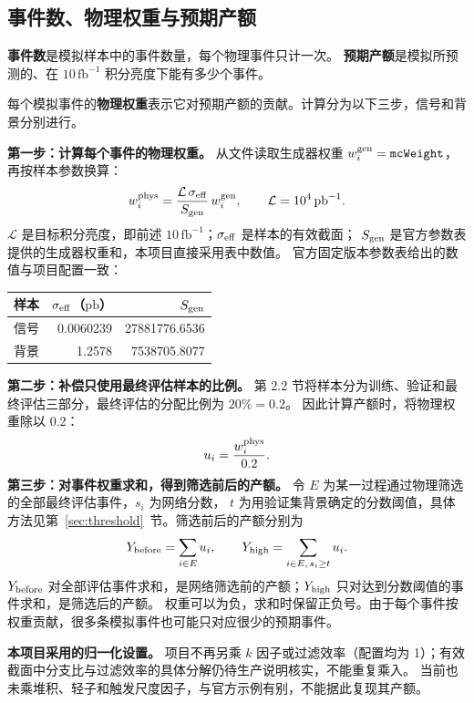 \documentclass[11pt,a4paper,fontset=fandol,scheme=plain]{ctexart}
\begin{document}
\subsection{事件数、物理权重与预期产额}

\label{sec:weights}
\textbf{事件数}是模拟样本中的事件数量，每个物理事件只计一次。
\textbf{预期产额}是模拟所预测的、在 $10\,\mathrm{fb}^{-1}$ 积分亮度下能有多少个事件。

每个模拟事件的\textbf{物理权重}表示它对预期产额的贡献。计算分为以下三步，信号和背景分别进行。

\textbf{第一步：计算每个事件的物理权重。}
从文件读取生成器权重 $w_i^{\rm gen}=\texttt{mcWeight}$，再按样本参数换算：
\[
 w_i^{\rm phys}=\frac{\mathcal L\,\sigma_{\rm eff}}{S_{\rm gen}}\,w_i^{\rm gen},
 \qquad \mathcal L=10^4\,\mathrm{pb}^{-1}.
\]
$\mathcal L$ 是目标积分亮度，即前述 $10\,\mathrm{fb}^{-1}$；$\sigma_{\rm eff}$ 是样本的有效截面；
$S_{\rm gen}$ 是官方参数表提供的生成器权重和，本项目直接采用表中数值。
官方固定版本参数表\cite{SampleInfo}给出的数值与项目配置一致：
\begin{center}
\small
\begin{tabular}{lrr}
\toprule
样本 & $\sigma_{\rm eff}$（$\mathrm{pb}$） & $S_{\rm gen}$ \\
\midrule
信号 & 0.0060239 & 27881776.6536 \\
背景 & 1.2578 & 7538705.8077 \\
\bottomrule
\end{tabular}
\end{center}

\textbf{第二步：补偿只使用最终评估样本的比例。}
第 2.2 节将样本分为训练、验证和最终评估三部分，最终评估的分配比例为 $20\%=0.2$。
因此计算产额时，将物理权重除以 0.2：
\[
 u_i=\frac{w_i^{\rm phys}}{0.2}.
\]
\textbf{第三步：对事件权重求和，得到筛选前后的产额。}
令 $E$ 为某一过程通过物理筛选的全部最终评估事件，$s_i$ 为网络分数，
$t$ 为用验证集背景确定的分数阈值，具体方法见第~\ref{sec:threshold}~节。筛选前后的产额分别为
\[
 Y_{\rm before}=\sum_{i\in E}u_i,\qquad
 Y_{\rm high}=\sum_{i\in E,\,s_i\geq t}u_i.
\]
$Y_{\rm before}$ 对全部评估事件求和，是网络筛选前的产额；$Y_{\rm high}$ 只对达到分数阈值的事件求和，是筛选后的产额。
权重可以为负，求和时保留正负号。由于每个事件按权重贡献，很多条模拟事件也可能只对应很少的预期事件。

\textbf{本项目采用的归一化设置。}
项目不再另乘 $k$ 因子或过滤效率（配置均为 1）；有效截面中分支比与过滤效率的具体分解仍待生产说明核实，不能重复乘入。
当前也未乘堆积、轻子和触发尺度因子，与官方示例\cite{HZZAnalysis}有别，不能据此复现其产额。
\end{document}
